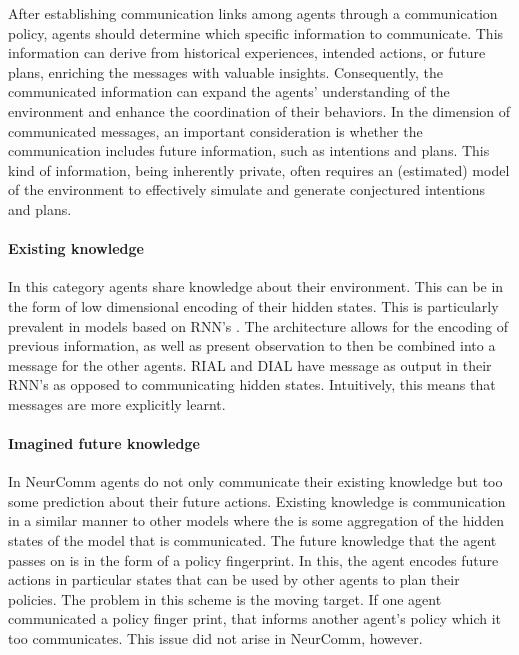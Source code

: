 \documentclass{article}
\begin{document}
After establishing communication links among agents through a communication policy, agents should determine which specific information to communicate. This information can derive from historical experiences, intended actions, or future plans, enriching the messages with valuable insights. Consequently, the communicated information can expand the agents’ understanding of the environment and enhance the coordination of their behaviors. In the dimension of communicated messages, an important consideration is whether the communication includes future information, such as intentions and plans. This kind of information, being inherently private, often requires an (estimated) model of the environment to effectively simulate and generate conjectured intentions and plans.

\paragraph{Existing knowledge} In this category agents share knowledge about their environment. This can be in the form of low dimensional encoding of their hidden states. This is particularly prevalent in models based on RNN's \citep{sukhbaatar2016commnet, peng2017bicnet, singh2018ic3net}. The architecture allows for the encoding of previous information, as well as present observation to then be combined into a message for the other agents. RIAL and DIAL \citep{foerster2016learning} have message as output in their RNN's as opposed to communicating hidden states. Intuitively, this means that messages are more explicitly learnt.

\paragraph{Imagined future knowledge} In NeurComm \citep{chu2020NeurComm} agents do not only communicate their existing knowledge but too some prediction about their future actions. Existing knowledge is communication in a similar manner to other models where the is some aggregation of the hidden states of the model that is communicated. The future knowledge that the agent passes on is in the form of a policy fingerprint. In this, the agent encodes future actions in particular states that can be used by other agents to plan their policies. The problem in this scheme is the moving target. If one agent communicated a policy finger print, that informs another agent's policy which it too communicates. This issue did not arise in NeurComm, however.
\end{document}
